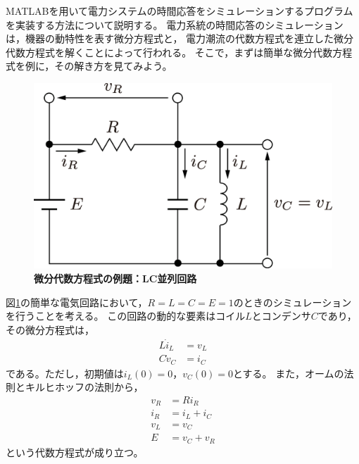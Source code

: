 {
\newcommand{\tr}{{\sf T}}
MATLABを用いて電力システムの時間応答をシミュレーションするプログラムを実装する方法について説明する。
電力系統の時間応答のシミュレーションは，機器の動特性を表す微分方程式と，
電力潮流の代数方程式を連立した微分代数方程式を解くことによって行われる。
そこで，まずは簡単な微分代数方程式を例に，その解き方を見てみよう。

\begin{例}[簡単な例題]\label{ex:dae_ex1}
\begin{figure}[t]
  \centering
  \includegraphics[width = .4\linewidth]{figs/circkawaguchi.eps}
  \medskip
  \caption{\textbf{微分代数方程式の例題：LC並列回路}}
  \label{fig:RLC}
  \medskip
\end{figure}
図\ref{fig:RLC}の簡単な電気回路において，$R=L=C=E=1$のときのシミュレーションを行うことを考える。
この回路の動的な要素はコイル$L$とコンデンサ$C$であり，その微分方程式は，
\begin{subequations}\label{eq:ex_de}
  \begin{align}
    L\dot i_L & = v_L \\
    C\dot v_C & = i_C
  \end{align}
\end{subequations}
である。ただし，初期値は$i_L(0)=0$，$v_C(0)=0$とする。
また，オームの法則とキルヒホッフの法則から，
\begin{subequations}\label{eq:ex_ae}
  \begin{align}
    v_R & =R i_R      \\
    i_R & = i_L + i_C \\
    v_L & = v_C       \\
    E   & = v_C + v_R
  \end{align}
\end{subequations}
という代数方程式が成り立つ。


\end{例}}
